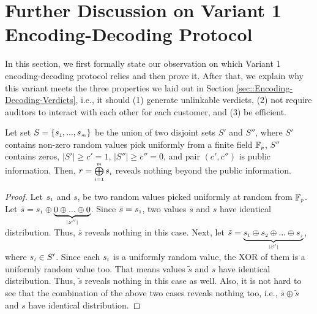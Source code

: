 \vspace{-3mm}
\section{Further Discussion on Variant 1 Encoding-Decoding Protocol}\label{sec::Variant-1-Theorem-proof}
In this section, we first formally state our observation on which  Variant 1 encoding-decoding protocol relies and then prove it. After that, we explain why this variant meets the three properties we laid out in Section \ref{sec::Encoding-Decoding-Verdicts}, i.e., it should (1) generate unlinkable verdicts, (2) not require auditors to interact with each other for each customer, and (3) be efficient.



\begin{theorem}\label{set-xor}
Let set $S=\{s_{\scriptscriptstyle 1},..., s_{\scriptscriptstyle m}\}$ be the union of  two disjoint sets $S'$ and $S''$, where $S'$ contains non-zero random values pick uniformly  from a finite field $\mathbb{F}_{\scriptscriptstyle p}$, $S''$ contains zeros, $|S'|\geq c'=1$, $|S''|\geq c''=0$, and pair $(c',c'')$ is public information. Then, $r= \bigoplus\limits^{\scriptscriptstyle m}_{\scriptscriptstyle i=1} s_{\scriptscriptstyle i}$ reveals nothing beyond the public information.  
\end{theorem}

\begin{proof}
Let $s_{\scriptscriptstyle 1}$ and $s$, be two random values picked uniformly at random from $\mathbb{F}_{\scriptscriptstyle p}$. Let $\bar s=s_{\scriptscriptstyle 1}\oplus \underbrace{0\oplus... \oplus 0}_{\scriptscriptstyle |S''|}$. Since  $\bar s=s_{\scriptscriptstyle 1}$, two values $\bar s$ and $s$ have identical distribution. Thus, $\bar s$ reveals nothing in this case. Next, let $\tilde s=\underbrace{ s_{\scriptscriptstyle 1}\oplus s_{\scriptscriptstyle 2}\oplus... \oplus s_{\scriptscriptstyle j}}_{\scriptscriptstyle |S'|}$, where $s_{\scriptscriptstyle i}\in S'$. Since each $s_{\scriptscriptstyle i}$ is a uniformly random value,  the XOR of them is a uniformly random value too. That means values $\tilde s$ and $s$ have identical distribution. Thus, $\tilde s$ reveals nothing in this case as well. Also, it is not hard to see that the combination of the above two cases reveals nothing too, i.e., $\bar s\oplus \tilde s$ and $s$ have    identical distribution. 
%
\end{proof}




